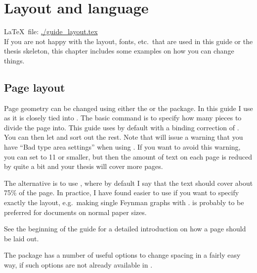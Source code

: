 
\chapter{Layout and language}%
\label{sec:layout}

\LaTeX\ file: \url{./guide_layout.tex}\\[1ex]
\noindent
If you are not happy with the layout, fonts, etc.\ that are used in
this guide or the thesis skeleton, this chapter includes some examples
on how you can change things.


\section{Page layout}%
\label{sec:layout:page}


Page geometry can be changed using either the  or
the  package. In this guide I use 
as it is closely tied into \KOMAScript. The basic command is to
specify how many pieces to divide the page into. This guide uses
 by default with a binding correction of
.  You can then let \KOMAScript{} and
 sort out the rest. Note that 
will issue a warning that you have \enquote{Bad type area settings}
when using . If you want to avoid this warning, you can
set  to 11 or smaller, but then the amount of text on each
page is reduced by quite a bit and your thesis will cover more pages.

The alternative is to use , where by default I say
that the text should cover about 75\% of the page. In practice, I have
found  easier to use if you want to specify exactly
the layout, e.g.\ making single Feynman graphs with
.  is probably to be preferred for
documents on normal paper sizes.

See the beginning of the \KOMAScript{} guide for a detailed
introduction on how a page should be laid out.

The  package has a number of useful options to change
spacing in a fairly easy way, if such options are not already
available in \KOMAScript.


